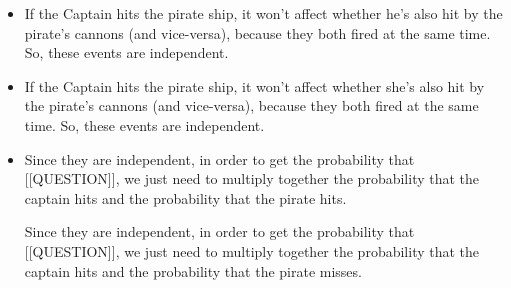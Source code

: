 \documentclass{article}
\begin{document}
\begin{itemize}
                    
                    [[SINGLE\_PCT]]\textbackslash\{\}\% of \textbackslash\{\}purple\{[[TWO\_PCT]]\textbackslash\{\}\%\} is
                    [[localeToFixed(PROB, 2)]] $\cdot$ [[localeToFixed(PROB*PROB, 3)]] \textbackslash\{\}approx [[localeToFixed(PROB\_CUBED, 3)]], or
                    about \textbackslash\{\}green\{[[THREE\_PCT]]\textbackslash\{\}\%\}:
                    
                
                
                    There is a pattern here: the chance of missing two free throws in a row was
                    [[localeToFixed(PROB, 2)]] $\cdot$ [[localeToFixed(PROB, 2)]], and the probability of missing
                    three in a row was [[localeToFixed(PROB, 2)]] $\cdot$ [[localeToFixed(PROB*PROB, 3)]] =
                    [[localeToFixed(PROB, 2)]] $\cdot$ ([[localeToFixed(PROB, 2)]] $\cdot$ [[localeToFixed(PROB, 2)]])
                    = [[localeToFixed(PROB, 2)]]\textasciicircum{}3.
                
                
                    In general, you can continue in this way to find the probability of missing any number of shots.
                
                
                    The probability of missing [[STREAK]] free throws in a row is
                    [[localeToFixed(PROB, 2)]] \textasciicircum{} [[STREAK]] = [[ANS]].
  \item If the Captain hits the pirate ship, it won't affect whether he's
                    also hit by the pirate's cannons (and vice-versa), because they both fired at the same time.
                    So, these events are independent.
  \item If the Captain hits the pirate ship, it won't affect whether she's
                    also hit by the pirate's cannons (and vice-versa), because they both fired at the same time.
                    So, these events are independent.
  \item Since they are independent, in order to get the probability that [[QUESTION]], we just need to multiply together
                    the probability that the captain hits and the probability that
                    the pirate hits.
                    
                        Since they are independent, in order to get the probability that [[QUESTION]], we just need to multiply together
                    the probability that the captain hits and the probability that
                    the pirate misses.
                    

\end{itemize}
\end{document}
